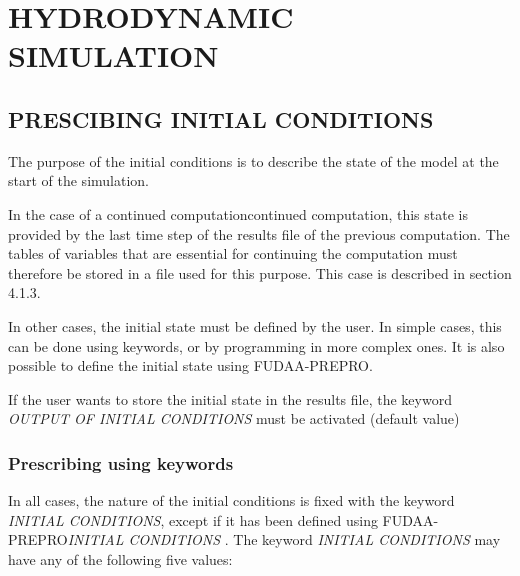 

\chapter{  HYDRODYNAMIC SIMULATION}


\section{ PRESCIBING INITIAL CONDITIONS}

 The purpose of the initial conditions is to describe the state of the model at the start of the simulation.

 In the case of a continued computationcontinued computation, this state is provided by the last time step of the results file of the previous computation. The tables of variables that are essential for continuing the computation must therefore be stored in a file used for this purpose. This case is described in section 4.1.3.

 In other cases, the initial state must be defined by the user. In simple cases, this can be done using keywords, or by programming in more complex ones. It is also possible to define the initial state using FUDAA-PREPRO.

 If the user wants to store the initial state in the results file, the keyword \textit{OUTPUT OF INITIAL CONDITIONS} must be activated (default value)


\subsection{ Prescribing using keywords}

 In all cases, the nature of the initial conditions is fixed with the keyword \textit{INITIAL CONDITIONS}, except if it has been defined using FUDAA-PREPRO\textit{INITIAL CONDITIONS }. The keyword \textit{INITIAL CONDITIONS} may have any of the following five values:

